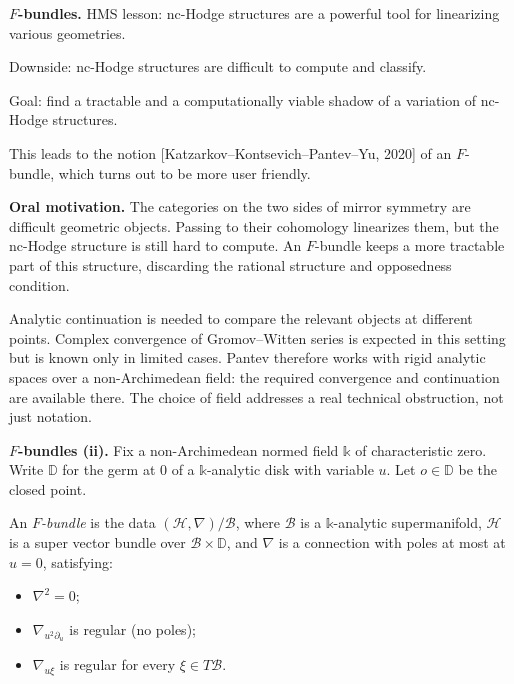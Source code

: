 \medskip\noindent
\textbf{$F$-bundles.}
HMS lesson: nc-Hodge structures are a
powerful tool for linearizing various
geometries.

Downside: nc-Hodge structures are difficult
to compute and classify.

Goal: find a tractable and a computationally
viable shadow of a variation of nc-Hodge
structures.

This leads to the notion
[Katzarkov--Kontsevich--Pantev--Yu, 2020]
of an $F$-bundle, which turns out to be
more user friendly.

\medskip\noindent
\textbf{Oral motivation.}
The categories on the two sides of mirror
symmetry are difficult geometric objects.
Passing to their cohomology linearizes them,
but the nc-Hodge structure is still hard to
compute. An $F$-bundle keeps a more tractable
part of this structure, discarding the
rational structure and opposedness condition.

Analytic continuation is needed to compare
the relevant objects at different points.
Complex convergence of Gromov--Witten series
is expected in this setting but is known
only in limited cases. Pantev therefore
works with rigid analytic spaces over a
non-Archimedean field: the required
convergence and continuation are available
there. The choice of field addresses a real
technical obstruction, not just notation.

\medskip\noindent
\textbf{$F$-bundles (ii).}
Fix a non-Archimedean normed field
$\mathbb k$ of characteristic zero.
Write $\mathbb D$ for the germ at $0$ of a
$\mathbb k$-analytic disk with variable $u$.
Let $o\in\mathbb D$ be the closed point.

An \emph{$F$-bundle} is the data
$(\mathcal H,\nabla)/\mathcal B$, where
$\mathcal B$ is a $\mathbb k$-analytic
supermanifold, $\mathcal H$ is a super
vector bundle over
$\mathcal B\times\mathbb D$, and $\nabla$
is a connection with poles at most at
$u=0$, satisfying:
\begin{itemize}
\item $\nabla^2=0$;
\item $\nabla_{u^2\partial_u}$ is regular
(no poles);
\item $\nabla_{u\xi}$ is regular for every
$\xi\in T\mathcal B$.
\end{itemize}

